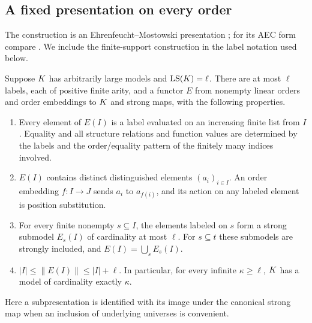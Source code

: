 \subsection{A fixed presentation on every order}

The construction is an Ehrenfeucht--Mostowski presentation
\cite{EhrenfeuchtMostowski1956}; for its AEC form compare
\cite[Definition~IV.0.8 and Claims~IV.0.9, IV.0.12]{Shelah2009}.
We include the finite-support construction in the label notation used below.

\begin{theorem}
\label{found:order-template}
Suppose $K$ has arbitrarily large models and $\operatorname{LS}(K)=\ell$.
There are at most $\ell$ labels, each of positive finite arity, and a
functor $E$ from nonempty linear orders and order embeddings to
$K$ and strong maps, with the following properties.
\begin{enumerate}
\item Every element of $E(I)$ is a label evaluated on an increasing
finite list from $I$. Equality and all structure relations and
function values are determined by the labels and the order/equality
pattern of the finitely many indices involved.
\item $E(I)$ contains distinct distinguished elements $(a_i)_{i\in I}$.
An order embedding $f:I\longrightarrow J$ sends $a_i$ to $a_{f(i)}$,
and its action on any labeled element is position substitution.
\item For every finite nonempty $s\subseteq I$, the elements labeled
on $s$ form a strong submodel $E_s(I)$ of cardinality at most $\ell$.
For $s\subseteq t$ these submodels are strongly included, and
$E(I)=\bigcup_s E_s(I)$.
\item $|I|\leq\|E(I)\|\leq |I|+\ell$. In particular, for every
infinite $\kappa\geq\ell$, $K$ has a model of cardinality exactly
$\kappa$.
\end{enumerate}
Here a subpresentation is identified with its image under the
canonical strong map when an inclusion of underlying universes is
convenient.
\end{theorem}

